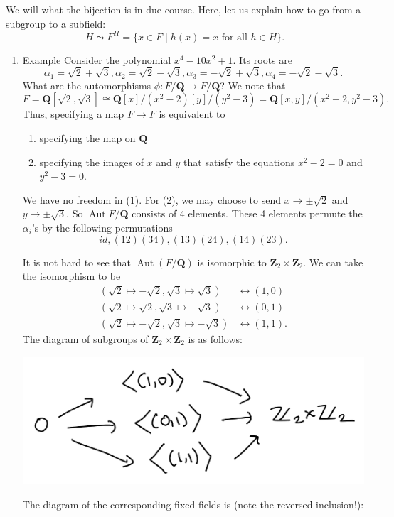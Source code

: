 \documentclass[11pt]{article}
\begin{document}
We will what the bijection is in due course. 
Here, let us explain how to go from a subgroup to a subfield:
\[ H \leadsto F^H = \{x \in F \mid h(x) = x \text{ for all } h \in H\}.\]
\begin{enumerate}
\item Example
\label{sec:orgc3fcaf4}
Consider the polynomial \(x^4-10x^2+1\).
Its roots are
\[ \alpha_1 = \sqrt 2 + \sqrt 3, \alpha_2 = \sqrt 2 - \sqrt 3, \alpha_3 = -\sqrt 2 + \sqrt 3, \alpha_4 = -\sqrt 2 - \sqrt 3.\]
What are the automorphisms \(\phi \colon F / \mathbf{Q} \to F / \mathbf{Q}\)?
We note that
\[ F = \mathbf{Q}[\sqrt 2, \sqrt 3] \cong \mathbf{Q}[x]/(x^2-2) [y]/(y^2-3) = \mathbf{Q}[x,y]/(x^2-2,y^2-3).\]
Thus, specifying a map \(F \to F\) is equivalent to
\begin{enumerate}
\item specifying the map on \(\mathbf{Q}\)
\item specifying the images of \(x\) and \(y\) that satisfy the equations \(x^2-2 = 0\) and \(y^2-3 = 0\).
\end{enumerate}
We have no freedom in (1). 
For (2), we may choose to send \(x \to \pm \sqrt 2\) and \(y \to \pm \sqrt 3\).
So \(\operatorname{Aut} F/ \mathbf{Q}\) consists of 4 elements.
These 4 elements permute the \(\alpha_{i}\)'s by the following permutations
\[ id, (12)(34), (13)(24), (14)(23).\]

It is not hard to see that \(\operatorname{Aut}(F/\mathbf{Q})\)  is isomorphic to \(\mathbf{Z}_2 \times \mathbf{Z}_2\).
We can take the isomorphism to be
\begin{align*}
(\sqrt 2 \mapsto -\sqrt 2, \sqrt 3 \mapsto \sqrt 3) &\leftrightarrow (1,0) \\
(\sqrt 2 \mapsto \sqrt 2, \sqrt 3 \mapsto -\sqrt 3) &\leftrightarrow (0,1) \\
(\sqrt 2 \mapsto - \sqrt 2, \sqrt 3 \mapsto -\sqrt 3) &\leftrightarrow (1,1).
\end{align*}
The diagram of subgroups of \(\mathbf{Z}_2 \times \mathbf{Z}_2\) is as follows:

\begin{center}
\includegraphics[width=.9\linewidth]{assets/Course_notes/2023-04-18_13-47-16_screenshot.png}
\end{center}
The diagram of the corresponding fixed fields is (note the reversed inclusion!):


\end{enumerate}
\end{document}
